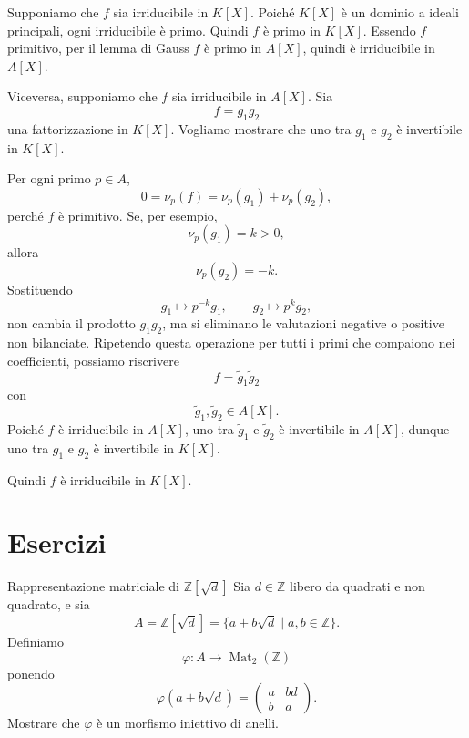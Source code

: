 \documentclass[a4paper]{article}
\begin{document}
\begin{radioactive}
\begin{snippetproof}{}
    Supponiamo che \(f\) sia irriducibile in \(K[X]\).
    Poiché \(K[X]\) è un dominio a ideali principali, ogni irriducibile è primo.
    Quindi \(f\) è primo in \(K[X]\).
    Essendo \(f\) primitivo, per il lemma di Gauss \(f\) è primo in \(A[X]\), quindi è irriducibile in \(A[X]\).

    Viceversa, supponiamo che \(f\) sia irriducibile in \(A[X]\).
    Sia
    \[
        f=g_1g_2
    \]
    una fattorizzazione in \(K[X]\).
    Vogliamo mostrare che uno tra \(g_1\) e \(g_2\) è invertibile in \(K[X]\).

    Per ogni primo \(p\in A\),
    \[
        0=\nu_p(f)=\nu_p(g_1)+\nu_p(g_2),
    \]
    perché \(f\) è primitivo.
    Se, per esempio,
    \[
        \nu_p(g_1)=k>0,
    \]
    allora
    \[
        \nu_p(g_2)=-k.
    \]
    Sostituendo
    \[
        g_1 \longmapsto p^{-k}g_1,
        \qquad
        g_2 \longmapsto p^kg_2,
    \]
    non cambia il prodotto \(g_1g_2\), ma si eliminano le valutazioni negative o positive non bilanciate.
    Ripetendo questa operazione per tutti i primi che compaiono nei coefficienti, possiamo riscrivere
    \[
        f=\widetilde{g}_1\widetilde{g}_2
    \]
    con
    \[
        \widetilde{g}_1,\widetilde{g}_2\in A[X].
    \]
    Poiché \(f\) è irriducibile in \(A[X]\), uno tra \(\widetilde{g}_1\) e \(\widetilde{g}_2\) è invertibile in \(A[X]\), dunque uno tra \(g_1\) e \(g_2\) è invertibile in \(K[X]\).

    Quindi \(f\) è irriducibile in \(K[X]\).
\end{snippetproof}
\end{radioactive}

\section{Esercizi}

\begin{radioactive}
\begin{snippetexercise}{Rappresentazione matriciale di \(\mathbb{Z}[\sqrt{d}]\)}
    Sia \(d\in\mathbb{Z}\) libero da quadrati e non quadrato, e sia
    \[
        A=\mathbb{Z}[\sqrt{d}]
        =
        \{a+b\sqrt{d}\mid a,b\in\mathbb{Z}\}.
    \]
    Definiamo
    \[
        \varphi\colon A\to \operatorname{Mat}_2(\mathbb{Z})
    \]
    ponendo
    \[
        \varphi(a+b\sqrt{d})
        =
        \begin{pmatrix}
            a & bd \\
            b & a
        \end{pmatrix}.
    \]
    Mostrare che \(\varphi\) è un morfismo iniettivo di anelli.
\end{snippetexercise}
\end{radioactive}
\end{document}
